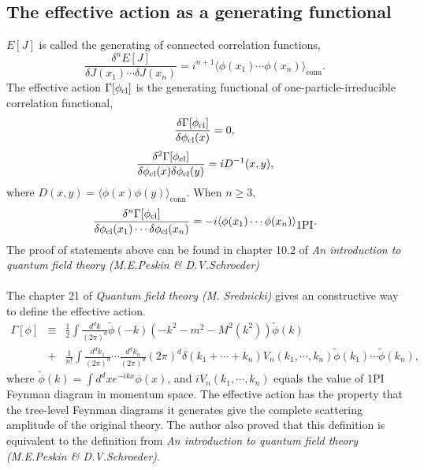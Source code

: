 \subsection{The effective action as a generating functional}
$E[J]$ is called the generating of connected correlation functions,
\[\frac{\delta^n E[J]}{\delta J(x_1) \cdots \delta J(x_n)} = i^{n+1} \langle \phi(x_1) \cdots \phi(x_n) \rangle_{\mbox{conn}}.\]
The effective action $\Gamma[\phi_{\rm cl}]$ is the generating functional of one-particle-irreducible correlation functional,
\[\frac{\delta \Gamma[\phi_{\rm cl}]}{\delta \phi_{\rm cl}(x)}  = 0,\]
\[\frac{\delta^2 \Gamma[\phi_{\rm cl}]}{\delta \phi_{\rm cl}(x) \delta \phi_{\rm cl}(y)}  = iD^{-1}(x,y),\]
where $D(x,y) = \langle \phi(x) \phi(y) \rangle_{\mbox{conn}}$. 
When $n \geq 3$,
\[\frac{\delta^n \Gamma[\phi_{\rm cl}]}{\delta \phi_{\rm cl}(x_1) \cdots \delta \phi_{\rm cl}(x_n)} = -i \langle \phi(x_1) \cdots \phi(x_n) \rangle_{\mbox{1PI}}.\]
The proof of statements above can be found in chapter 10.2 of \emph{An introduction to quantum field theory (M.E.Peskin \& D.V.Schroeder)}
\\ \\
The chapter 21 of \emph{Quantum field theory (M. Srednicki)} gives an constructive way to define the effective action.
\begin{eqnarray}
\Gamma[\phi] & \equiv & \frac{1}{2} \int \frac{d^d k}{(2\pi)^d} \tilde{\phi}(-k)(-k^2 - m^2 - M^2(k^2))\tilde{\phi}(k) \nonumber \\
& + & \frac{1}{n!} \int \frac{d^d k_1}{(2\pi)^d} \cdots \frac{d^d k_n}{(2\pi)^d} (2\pi)^d \delta(k_1+\cdots+k_n) V_n(k_1,\cdots,k_n) \tilde{\phi}(k_1) \cdots \tilde{\phi}(k_n) ,\nonumber
\end{eqnarray}
where $\tilde{\phi}(k) = \int d^dx e^{-ikx} \phi(x)$, and $iV_n(k_1,\cdots,k_n)$ equals the value of 1PI Feynman diagram in momentum space. The effective action has the property that the tree-level Feynman diagrams it generates give the complete scattering amplitude of the original theory. The author also proved that this definition is equivalent to the definition from \emph{An introduction to quantum field theory (M.E.Peskin \& D.V.Schroeder)}.

